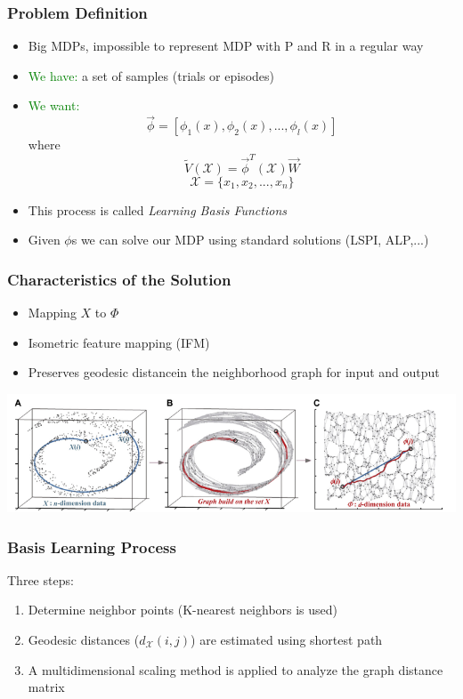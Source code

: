 \documentclass{beamer}
\newcommand{\tc}[2]{\textcolor{#1}{#2}}
\newcommand{\tcg}[1]{\tc{green}{#1}}
\begin{document}
\begin{frame}
	\frametitle{Problem Definition}
	\begin{itemize}
		\item Big MDPs, impossible to represent MDP with P and R in a regular way
		\item \tcg{We have:} a set of samples (trials or episodes)
		\item \tcg{We want:}
		\[
			\vec{\phi} = [ \phi_1(x), \phi_2(x), ... ,\phi_l(x)]
		\]
		where
		\[
			\tilde{V}(\mathcal{X}) = \vec{\phi}^T (\mathcal{X}) \vec{W}
		\]
		\[
			\mathcal{X} = \{ x_1, x_2, ... , x_n \}
		\]
		\item This process is called \emph{Learning Basis Functions}
		\item Given $\phi$s we can solve our MDP using standard solutions (LSPI, ALP,...) 
	\end{itemize}
\end{frame}

\begin{frame}
	\frametitle{Characteristics of the Solution}
	\begin{itemize}
		\item Mapping $X$ to $\Phi$
		\item Isometric feature mapping (IFM)
		\item Preserves geodesic distance\footnotemark[1] in the neighborhood graph for input and output
	\end{itemize}
	\begin{center}\includegraphics[width=\linewidth]{3.png}\end{center}	
\end{frame}

\begin{frame}
	\frametitle{Basis Learning Process}
	Three steps:
	\begin{enumerate}
		\item Determine neighbor points (K-nearest neighbors is used)
		\item Geodesic distances ($d_{\mathcal{X}}(i,j)$) are estimated using shortest path
		\item A multidimensional scaling method is applied to analyze the graph distance matrix
	\end{enumerate}
\end{frame}
\end{document}
